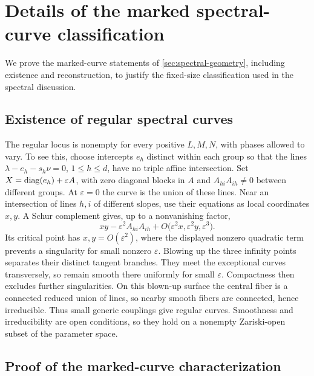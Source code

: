 \section{Details of the marked spectral-curve classification}
\label{sec:geometry-details}

We prove the marked-curve statements of \cref{sec:spectral-geometry},
including existence and reconstruction, to justify the fixed-size
classification used in the spectral discussion.

\subsection{Existence of regular spectral curves}

The regular locus is nonempty for every positive $L,M,N$, with
phases allowed to vary. To see this, choose intercepts $e_h$ distinct
within each group so that the lines
$\lambda-e_h-s_h\nu=0$, $1\leq h\leq d$, have no triple affine
intersection. Set $X=\operatorname{diag}(e_h)+\varepsilon A$, with zero diagonal
blocks in $A$ and $A_{hi}A_{ih}\ne0$ between different groups.
At $\varepsilon=0$ the curve is the union of these lines.
Near an intersection of lines $h,i$ of different slopes, use their
equations as local coordinates $x,y$. A Schur complement gives,
up to a nonvanishing factor,
\[
 xy-\varepsilon^2 A_{hi}A_{ih}
   +O\bigl(\varepsilon^2x,\varepsilon^2y,\varepsilon^3\bigr).
\]
Its critical point has $x,y=O(\varepsilon^2)$, where the displayed
nonzero quadratic term prevents a singularity for small nonzero
$\varepsilon$. Blowing up the three infinity points separates their
distinct tangent branches. They meet the exceptional curves
transversely, so remain smooth there uniformly for small $\varepsilon$.
Compactness then
excludes further singularities. On this blown-up surface the central
fiber is a connected reduced union of lines, so nearby smooth fibers
are connected, hence irreducible. Thus small generic couplings give
regular curves. Smoothness and irreducibility are open conditions,
so they hold on a nonempty Zariski-open subset of the parameter space.

\subsection{Proof of the marked-curve characterization}

